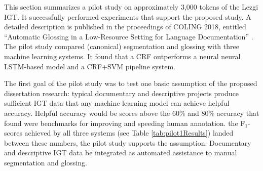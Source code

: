 This section summarizes a pilot study on approximately 3,000 tokens of the Lezgi IGT. It successfully performed experiments that support the proposed study. A detailed description is published in the proceedings of COLING 2018, entitled ``Automatic Glossing in a Low-Resource Setting for Language Documentation'' \citep{moeller_automatic_2018}. The pilot study compared (canonical) segmentation and glossing with three machine learning systems. It found that a CRF outperforms a neural neural LSTM-based model and a CRF+SVM pipeline system. 

The first goal of the pilot study was to test one basic assumption of the proposed dissertation research: typical documentary and descriptive projects produce sufficient IGT data that any machine learning model can achieve helpful accuracy. Helpful accuracy would be scores above the 60\% and 80\% accuracy that \cite{felt_improving_2012} found were benchmarks for improving and speeding human annotation. 
the F$_1$-scores achieved by all three systems (see Table \ref{tab:pilot1Results}) landed between these numbers, the pilot study supports the assumption. Documentary and descriptive IGT data be integrated as automated assistance to manual segmentation and glossing. 

